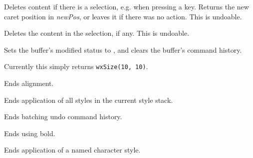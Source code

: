 Deletes content if there is a selection, e.g. when pressing a key.
Returns the new caret position in {\it newPos}, or leaves it if there
was no action. This is undoable.

\label{wxrichtextctrldeleteselection}


Deletes the content in the selection, if any. This is undoable.

\label{wxrichtextctrldiscardedits}


Sets the buffer's modified status to \false, and clears the buffer's command history.

\label{wxrichtextctrldogetbestsize}


Currently this simply returns {\tt wxSize(10, 10)}.

\label{wxrichtextctrlendalignment}


Ends alignment.

\label{wxrichtextctrlendallstyles}


Ends application of all styles in the current style stack.

\label{wxrichtextctrlendbatchundo}


Ends batching undo command history.

\label{wxrichtextctrlendbold}


Ends using bold.

\label{wxrichtextctrlendcharacterstyle}


Ends application of a named character style.

\label{wxrichtextctrlendfont}


